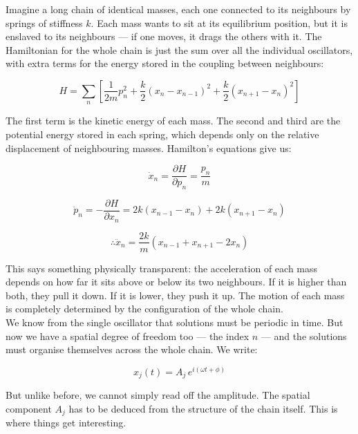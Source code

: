 \documentclass[krantz1,ChapterTOCs]{krantz}
\begin{document}
Imagine a long chain of identical masses, each one connected to its 
neighbours by springs of stiffness $k$. Each mass wants to sit at its 
equilibrium position, but it is enslaved to its neighbours --- if one 
moves, it drags the others with it. The Hamiltonian for the whole chain 
is just the sum over all the individual oscillators, with extra terms 
for the energy stored in the coupling between neighbours:

\begin{equation}
H = \sum_{n} \left[ \frac{1}{2m} p_n^2 + \frac{k}{2} \left( x_n - 
x_{n-1} \right)^2 + \frac{k}{2} \left( x_{n+1} - x_n \right)^2 \right]
\end{equation}

The first term is the kinetic energy of each mass. The second and third 
are the potential energy stored in each spring, which depends only on 
the relative displacement of neighbouring masses. Hamilton's equations 
give us:

\begin{equation}
\dot{x}_n = \frac{\partial H}{\partial p_n} = \frac{p_n}{m}
\end{equation}

\begin{equation}
\dot{p}_n = -\frac{\partial H}{\partial x_n} = 2k \left( x_{n-1} - 
x_n \right) + 2k \left( x_{n+1} - x_n \right)
\end{equation}

\begin{equation}
\therefore \ddot{x}_n = \frac{2k}{m} \left( x_{n-1} + x_{n+1} - 
2x_n \right)
\end{equation}

This says something physically transparent: the acceleration of each 
mass depends on how far it sits above or below its two neighbours. If 
it is higher than both, they pull it down. If it is lower, they push 
it up. The motion of each mass is completely determined by the 
configuration of the whole chain.\\

We know from the single oscillator that solutions must be periodic in 
time. But now we have a spatial degree of freedom too --- the index $n$ 
--- and the solutions must organise themselves across the whole chain. 
We write:

\begin{equation}
x_j(t) = A_j\, e^{i(\omega t + \phi)}
\end{equation}

But unlike before, we cannot simply read off the amplitude. The spatial 
component $A_j$ has to be deduced from the structure of the chain 
itself. This is where things get interesting.\\
\end{document}
